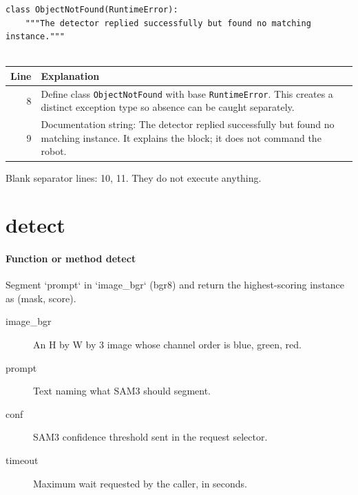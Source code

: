 \documentclass[11pt,a4paper]{book}
\begin{document}
\begin{lstlisting}[firstnumber=8]
class ObjectNotFound(RuntimeError):
    """The detector replied successfully but found no matching instance."""


\end{lstlisting}

\begin{longtable}{r p{}}

\textbf{Line} & \textbf{Explanation} \\ \hline \endhead

8 & Define class \texttt{ObjectNotFound} with base \texttt{RuntimeError}. This creates a distinct exception type so absence can be caught separately. \\

9 & Documentation string: The detector replied successfully but found no matching instance. It explains the block; it does not command the robot. \\

\end{longtable}

Blank separator lines: 10, 11. They do not execute anything.

\section{detect}

\paragraph{Function or method detect}
Segment `prompt` in `image\_bgr` (bgr8) and return the highest-scoring instance as (mask, score).

\begin{description}
\item[image\_bgr] An H by W by 3 image whose channel order is blue, green, red.
\item[prompt] Text naming what SAM3 should segment.
\item[conf] SAM3 confidence threshold sent in the request selector.
\item[timeout] Maximum wait requested by the caller, in seconds.
\end{description}
\end{document}

